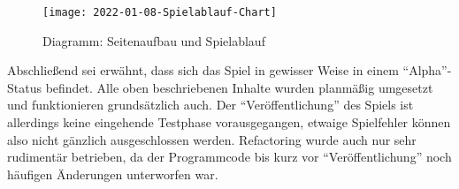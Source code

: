 \begin{figure}[H]
    \centering
    \caption{Diagramm: Seitenaufbau und Spielablauf}
    \label{fig:2022-01-08-Spielablauf-Chart}
    \texttt{[image: 2022-01-08-Spielablauf-Chart]}
\end{figure}

Abschließend sei erwähnt, dass sich das Spiel in gewisser Weise in einem \enquote{Alpha}-Status befindet. Alle oben beschriebenen Inhalte wurden planmäßig umgesetzt und funktionieren grundsätzlich auch. Der \enquote{Veröffentlichung} des Spiels ist allerdings keine eingehende Testphase vorausgegangen, etwaige Spielfehler können also nicht gänzlich ausgeschlossen werden. Refactoring wurde auch nur sehr rudimentär betrieben, da der Programmcode bis kurz vor \enquote{Veröffentlichung} noch häufigen Änderungen unterworfen war.

